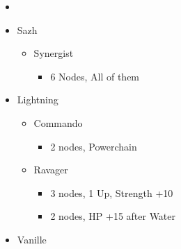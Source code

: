 \renewcommand{\first}{[1] Relentless Assault (\rav/\com/\rav)}
\renewcommand{\second}{[2] Bully (\syn/\com/\sab)}
\renewcommand{\third}{[3] Relentless Assault (\rav/\com/\rav)}
\renewcommand{\fourth}{[4] Smart Bomb (\rav/\rav/\sab)}
\renewcommand{\fifth}{[5] Tri-Disaster (\rav/\rav/\rav)}
\renewcommand{\sixth}{[6] Malevolence (\syn/\rav/\rav)}
	\begin{menu}
		\begin{itemize}
			\paradigm
			\begin{itemize}
				\item {}%
				      {\paradigmline{\rav}{\com}{\rav}}%
				      {\paradigmline{\syn}{\com}{\sab}}%
				      {\paradigmline{\rav}{\com}{(\rav)}}%
				      {\paradigmline[4]{\textit{\rav}}{\textit{\rav}}{\textit{\sab}}}%
				      {\paradigmline{\rav}{[\rav]}{\rav}}%
				      {\paradigmline{[\syn]}{(\rav)}{\rav}}
			\end{itemize}
			\columnbreak
			\crystarium
			\begin{itemize}
				\item Sazh
				      \begin{itemize}
					      \item Synergist
					            \begin{itemize}
						            \item 6 Nodes, All of them
					            \end{itemize}
				      \end{itemize}
				\item Lightning
				      \begin{itemize}
					      \item Commando
					            \begin{itemize}
						            \item 2 nodes, Powerchain
					            \end{itemize}
					      \item Ravager
					            \begin{itemize}
						            \item 3 nodes, 1 Up, Strength +10
						            \item 2 nodes, HP +15 after Water
					            \end{itemize}
				      \end{itemize}
				\item Vanille
				      \begin{itemize}

\end{itemize}
\end{itemize}
\end{itemize}
\end{menu}

